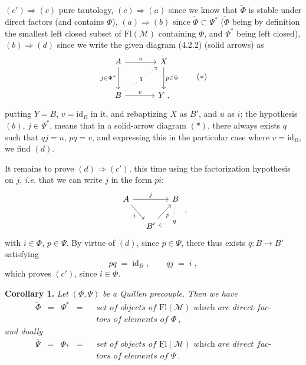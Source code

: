 \documentclass[11pt]{article}
\newcommand{\printedpage}[1]{\marginpar{\footnotesize p.~#1}}
\newcommand{\msp}[1]{\marginpar{\footnotesize [#1]}}
\newcommand{\Fl}{\mathrm{Fl}}
\newcommand{\id}{\mathrm{id}}
\begin{document}
$(c')\Longrightarrow(c)$ pure tautology, $(c)\Longrightarrow(a)$ since we know that $\widetilde{\Phi}$ is stable under direct factors (and contains $\Phi$), $(a)\Longrightarrow(b)$ since $\widetilde{\Phi}\subset\Psi^*$ ($\widetilde{\Phi}$ being by definition the smallest left closed subset of $\Fl(\mathcal{M})$ containing $\Phi$, and $\Psi^*$ being left closed), $(b)\Longrightarrow(d)$ since we write the given diagram (4.2.2) (solid arrows) as %
\[
\begin{tikzcd}[row sep=large, column sep=large]
A \arrow[r, "u"] \arrow[d, "j\in\Psi^*"'] & X \arrow[d, "p\in\Psi"] \\
B \arrow[ur, dotted, "q" description] \arrow[r, "v"] & Y \;,
\end{tikzcd}
\tag*{$(*)$}
\]
putting $Y=B$, $v=\id_B$ in it, and rebaptizing $X$ as $B'$, and $u$ as $i$: the hypothesis $(b)$, $j\in\Psi^*$, means that in a solid-arrow diagram $(*)$, there always exists $q$ such that $qj=u$, $pq=v$, and expressing this in the particular case where $v=\id_B$, we find $(d)$.

It remains to prove $(d)\Longrightarrow(c')$, this time using the factorization hypothesis on $j$, \textit{i.e.} that we can write $j$ in the form $pi$:
\[
\begin{tikzcd}[column sep=small]
A \arrow[rr, "j"] \arrow[dr, "i"'] & & B \arrow[dl, dotted, bend left=40, "q"] \\
& B' \arrow[ur, "p"'] &
\end{tikzcd}
\;,
\]
with $i\in\Phi$, $p\in\Psi$. By virtue of $(d)$, since $p\in\Psi$, there thus exists $q:B\longrightarrow B'$ satisfying
\printedpage{21}
\msp{page 31}
\[
pq \;=\; \id_B\;, \qquad qj \;=\; i\;,
\]
which proves $(c')$, since $i\in\Phi$.

\textbf{Corollary 1.} \textit{Let} $(\Phi,\Psi)$ \textit{be a Quillen precouple. Then we have}
\[
\begin{aligned}
\widetilde{\Phi} \;\;=\;\; \Psi^* \;\;=\;\; &\textit{set of objects of } \underline{\Fl}(\mathcal{M}) \textit{ which are direct fac-}\\
&\textit{tors of elements of } \Phi\ ,
\end{aligned}
\tag*{(4.3)}
\] %
\textit{and dually}
\[
\begin{aligned}
\overline{\Psi} \;\;=\;\; \Phi_* \;\;=\;\; &\textit{set of objects of } \underline{\Fl}(\mathcal{M}) \textit{ which are direct fac-}\\
&\textit{tors of elements of } \Psi\ .
\end{aligned}
\tag*{(4.4)}
\] %
\end{document}
